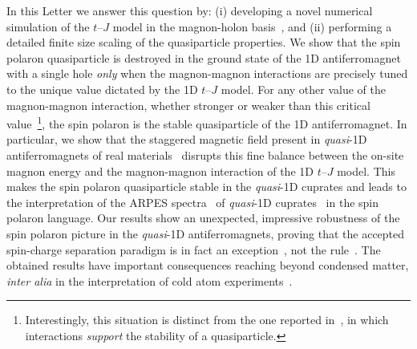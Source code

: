 \documentclass[%
 reprint,
 amsmath,amssymb,
 aps,
prl,
]{revtex4-1}
\begin{document}
In this Letter we answer this question by: (i) developing a novel  numerical simulation of the $t$--$J$ model in the magnon-holon basis~\cite{Mar91}, and (ii) performing a detailed finite size scaling of the quasiparticle properties. We show that the spin polaron quasiparticle is destroyed in the ground state of the 1D antiferromagnet with a single hole {\it only} when the magnon-magnon interactions are precisely tuned to the unique value dictated by the 1D $t$--$J$ model. 
For any other value of the magnon-magnon interaction, whether stronger or weaker than this critical value~\footnote{Interestingly, this situation is distinct from the one reported in~\cite{Ver19}, in which interactions {\it support} the stability of a quasiparticle.}, the spin polaron is the stable quasiparticle of the 1D antiferromagnet. 
In particular, we show that the staggered magnetic field present in {\it quasi}-1D antiferromagnets of real materials~\cite{Kojima1997, Matsuda1997, Lake2005}
disrupts this fine balance between the on-site magnon energy and the magnon-magnon interaction of the 1D $t$--$J$ model.
This makes the spin polaron quasiparticle stable in the {\it quasi}-1D cuprates and leads to the interpretation of the ARPES spectra~\cite{Sobota2021} 
of {\it quasi}-1D cuprates~\cite{Kim96, Kim1997, Fujisawa1999, Koitzsch2006, Kim06} in the spin polaron language. Our results show an unexpected, impressive robustness of the spin polaron picture in the {\it quasi}-1D antiferromagnets, proving that the accepted spin-charge separation paradigm is in fact an exception~\cite{Bonca1992, Greiter2002,  Schmidt2003, Smakov2007, Lake2010, Yang2022}, not the rule~\cite{Giamarchi2003}. The obtained results have important consequences reaching beyond condensed matter, {\it inter alia} in the interpretation of cold atom experiments~\cite{Bohrdt2021, Koepsell2021}.
\end{document}
